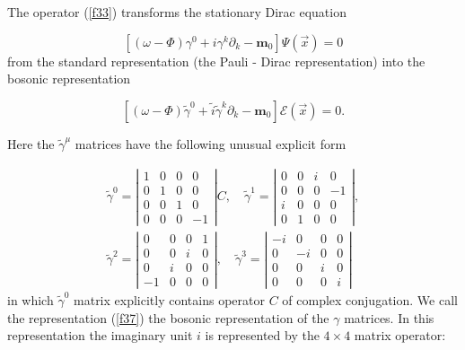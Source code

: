 \documentclass[a4paper,12pt]{article}
\begin{document}
The operator (\ref{f33}) transforms the stationary Dirac equation

\begin{equation}  \label{f35}
\left[ \left( \omega -\Phi \right) \gamma ^0+i\gamma ^k\partial _k-\mathbf{m}%
_0\right] \Psi \left( \overrightarrow{x}\right) =0
\end{equation}
from the standard representation (the Pauli - Dirac representation) into the
bosonic representation

\begin{equation}  \label{f36}
\left[ \left( \omega -\Phi \right) \widetilde{\gamma }^0+\widetilde{i}%
\widetilde{\gamma }^k\partial _k-\mathbf{m}_0\right] \mathcal{E}\left(
\overrightarrow{x}\right) =0.
\end{equation}

Here the $\widetilde{\gamma }^\mu $ matrices have the following unusual
explicit form

\begin{equation}
\begin{array}{c}
\widetilde{\gamma }^0=\left|
\begin{array}{cccc}
1 & 0 & 0 & 0 \\
0 & 1 & 0 & 0 \\
0 & 0 & 1 & 0 \\
0 & 0 & 0 & -1
\end{array}
\right| C,\quad \widetilde{\gamma }^1=\left|
\begin{array}{cccc}
0 & 0 & i & 0 \\
0 & 0 & 0 & -1 \\
i & 0 & 0 & 0 \\
0 & 1 & 0 & 0
\end{array}
\right| , \\
\widetilde{\gamma }^2=\left|
\begin{array}{cccc}
0 & 0 & 0 & 1 \\
0 & 0 & i & 0 \\
0 & i & 0 & 0 \\
-1 & 0 & 0 & 0
\end{array}
\right| ,\quad \widetilde{\gamma }^3=\left|
\begin{array}{cccc}
-i & 0 & 0 & 0 \\
0 & -i & 0 & 0 \\
0 & 0 & i & 0 \\
0 & 0 & 0 & i
\end{array}
\right|
\end{array}
\label{f37}
\end{equation}
in which $\widetilde{\gamma }^0$ matrix explicitly contains operator $C$ of
complex conjugation. We call the representation (\ref{f37}) the bosonic
representation of the $\gamma $ matrices. In this representation the
imaginary unit $i$ is represented by the $4\times 4$ matrix operator:
\end{document}
